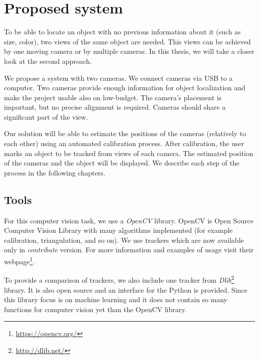 \chapter{Proposed system}

To be able to locate an object with no previous information about it (such as
size, color), two views of the same object are needed. This views can be
achieved by one moving camera or by multiple cameras. In this thesis, we will
take a closer look at the second approach.

We propose a system with two cameras. We connect cameras via USB to a computer.
Two cameras provide enough information for object localization and make the
project usable also on low-budget. The camera's placement is important, but no
precise alignment is required. Cameras should share a significant part of the
view.


Our solution will be able to estimate the positions of the cameras (relatively
to each other) using an automated calibration process. After calibration, the
user marks an object to be tracked from views of each camera. The estimated
position of the cameras and the object will be displayed. We describe each step
of the process in the following chapters.

\section{Tools}

For this computer vision task, we use a \emph{OpenCV} library. OpenCV is Open
Source Computer Vision Library with many algorithms implemented (for example
calibration, triangulation, and so on). We use trackers which are now available
only in \emph{contribute} version. For more information and examples of usage
visit their webpage\footnote{\url{https://opencv.org/}}.

To provide a comparison of trackers, we also include one tracker from
\emph{Dlib}\footnote{\url{http://dlib.net/}} library. It is also open source and an
interface for the Python is provided.  Since this library focus is on machine
learning and it does not contain so many functions for computer vision yet than
the OpenCV library. 
